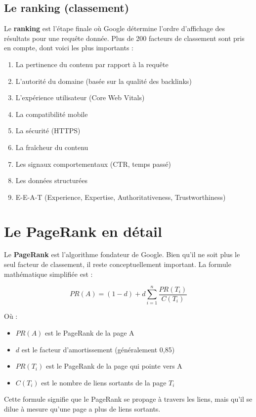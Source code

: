 \documentclass[12pt,a4paper,twoside]{report}
\newcommand{\keyword}[1]{\textbf{\textcolor{googleblue}{#1}}}
\begin{document}
\subsection{Le ranking (classement)}

Le \keyword{ranking} est l'étape finale où Google détermine l'ordre d'affichage des résultats pour une requête donnée. Plus de 200 facteurs de classement sont pris en compte, dont voici les plus importants :

\begin{enumerate}
    \item La pertinence du contenu par rapport à la requête
    \item L'autorité du domaine (basée sur la qualité des backlinks)
    \item L'expérience utilisateur (Core Web Vitals)
    \item La compatibilité mobile
    \item La sécurité (HTTPS)
    \item La fraîcheur du contenu
    \item Les signaux comportementaux (CTR, temps passé)
    \item Les données structurées
    \item E-E-A-T (Experience, Expertise, Authoritativeness, Trustworthiness)
\end{enumerate}

\section{Le PageRank en détail}

Le \keyword{PageRank} est l'algorithme fondateur de Google. Bien qu'il ne soit plus le seul facteur de classement, il reste conceptuellement important. La formule mathématique simplifiée est :

\[
PR(A) = (1-d) + d \sum_{i=1}^{n} \frac{PR(T_i)}{C(T_i)}
\]

Où :
\begin{itemize}
    \item $PR(A)$ est le PageRank de la page A
    \item $d$ est le facteur d'amortissement (généralement 0,85)
    \item $PR(T_i)$ est le PageRank de la page qui pointe vers A
    \item $C(T_i)$ est le nombre de liens sortants de la page $T_i$
\end{itemize}

Cette formule signifie que le PageRank se propage à travers les liens, mais qu'il se dilue à mesure qu'une page a plus de liens sortants.
\end{document}
